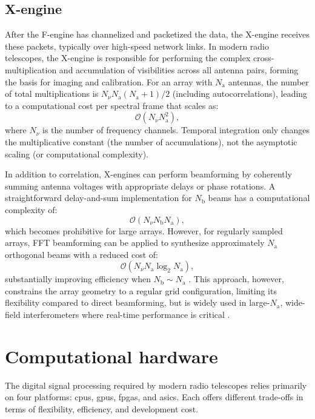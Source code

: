 \subsection{X-engine}
After the F-engine has channelized and packetized the data, the X-engine receives these packets, typically over high-speed network links. In modern radio telescopes, the X-engine is responsible for performing the complex cross-multiplication and accumulation of visibilities across all antenna pairs, forming the basis for imaging and calibration.
For an array with $N_\text{a}$ antennas, the number of total multiplications is $N_\nu N_\text{a}(N_\text{a}+1)/2$ (including autocorrelations), leading to a computational cost per spectral frame that scales as:
\begin{equation}
	\mathcal{O} \left(N_\nu N_\text{a}^2\right),
\end{equation}
where $N_\nu$ is the number of frequency channels. Temporal integration only changes the multiplicative constant (the number of accumulations), not the asymptotic scaling (or computational complexity).

In addition to correlation, X-engines can perform beamforming by coherently summing antenna voltages with appropriate delays or phase rotations. A straightforward delay-and-sum implementation for $N_\text{b}$ beams has a computational complexity of:
\begin{equation}
\mathcal{O}\left(N_\nu N_\text{b} N_\text{a}\right),
\end{equation}
which becomes prohibitive for large arrays. However, for regularly sampled arrays, FFT beamforming can be applied to synthesize approximately $N_\text{a}$ orthogonal beams with a reduced cost of:
\begin{equation}
\mathcal{O}\left(N_\nu N_\text{a}\log_2 N_\text{a}\right),
\end{equation}
substantially improving efficiency when $ N_\text{b} \sim N_\text{a}$ \citep{Masui_2019}.
This approach, however, constrains the array geometry to a regular grid configuration, limiting its flexibility compared to direct beamforming, but is widely used in large-$N_\text{a}$, wide-field interferometers where real-time performance is critical \citep{Price_2024}.

\section{Computational hardware}
\label{sec:computational_hardware}
The digital signal processing required by modern radio telescopes relies primarily on four platforms: \glspl{cpu}, \glspl{gpu}, \glspl{fpga}, and \glspl{asic}. Each offers different trade-offs in terms of flexibility, efficiency, and development cost.  

